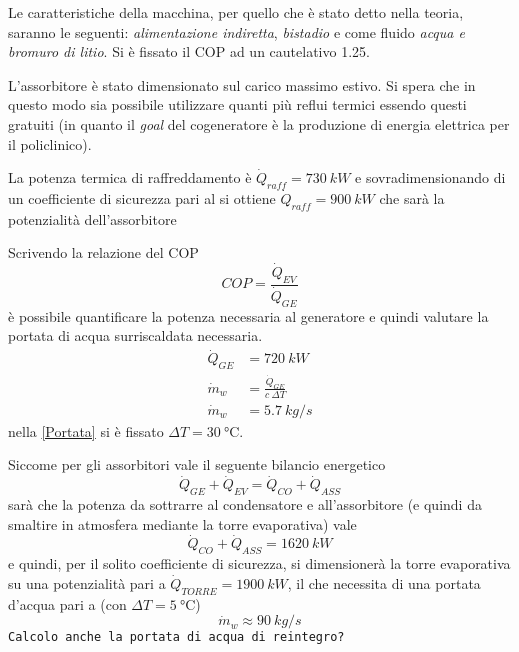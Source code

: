 Le caratteristiche della macchina, per quello che è stato detto nella teoria, saranno le seguenti: \emph{alimentazione indiretta}, \emph{bistadio} e come fluido \emph{acqua e bromuro di litio}. Si è fissato il COP ad un cautelativo \num{1.25}. 

L'assorbitore è stato dimensionato sul carico massimo estivo. Si spera che in questo modo sia possibile utilizzare quanti più reflui termici essendo questi gratuiti (in quanto il \emph{goal} del cogeneratore è la produzione di energia elettrica per il policlinico).

La potenza termica di raffreddamento è $\dot{Q}_{raff}=\SI{730}{kW}$ e sovradimensionando di un coefficiente di sicurezza pari al  si ottiene $\dot{Q}_{raff}=\SI{900}{kW}$ che sarà la potenzialità dell'assorbitore

Scrivendo la relazione del COP
\begin{equation}
	COP=\frac{\dot{Q}_{EV}}{\dot{Q}_{GE}}
\end{equation}
è possibile quantificare la potenza necessaria al generatore e quindi valutare la portata di acqua surriscaldata necessaria. 
\begin{align}
	\dot{Q}_{GE} &= \SI{720}{kW}\\
	\dot{m}_w &= \frac{\dot{Q}_{GE}}{c\ \Delta T}\label{Portata}\\
	\dot{m}_w&=\SI{5.7}{kg/s}\label{Portata:acquacalda}
\end{align}
nella \vref{Portata} si è fissato $\Delta T=\SI{30}{\degreeCelsius}$.

Siccome per gli assorbitori vale il seguente bilancio energetico
\begin{equation}
	\dot{Q}_{GE}+\dot{Q}_{EV}=\dot{Q}_{CO}+\dot{Q}_{ASS}
\end{equation}
sarà che la potenza da sottrarre al condensatore e all'assorbitore (e quindi da smaltire in atmosfera mediante la torre evaporativa) vale
\begin{equation}
	\dot{Q}_{CO}+\dot{Q}_{ASS}=\SI{1620}{kW}
\end{equation}
e quindi, per il solito coefficiente di sicurezza, si dimensionerà la torre evaporativa su una potenzialità pari a $\dot{Q}_{TORRE}=\SI{1900}{kW}$, il che necessita di una portata d'acqua pari a (con $\Delta T=\SI{5}{\degreeCelsius}$)
\begin{equation}
	\dot{m}_w\approx \SI{90}{kg/s}
\end{equation}
\texttt{Calcolo anche la portata di acqua di reintegro?}
